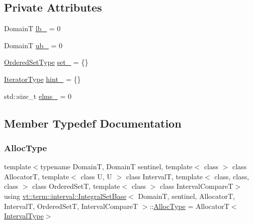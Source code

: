 \subsection*{Private Attributes}
\begin{DoxyCompactItemize}
\item 
DomainT \hyperlink{structvt_1_1term_1_1interval_1_1_integral_set_base_a81a48c32a51a56d1006dc212b2de60aa}{lb\+\_\+} = 0
\item 
DomainT \hyperlink{structvt_1_1term_1_1interval_1_1_integral_set_base_ace5d01da6b573a7e13405b362ca57f48}{ub\+\_\+} = 0
\item 
\hyperlink{structvt_1_1term_1_1interval_1_1_integral_set_base_af29bc3750493c7de4043f43ef7eb2ca2}{Ordered\+Set\+Type} \hyperlink{structvt_1_1term_1_1interval_1_1_integral_set_base_a5ed151f2f412d1df26f6b1fae4515bad}{set\+\_\+} = \{\}
\item 
\hyperlink{structvt_1_1term_1_1interval_1_1_integral_set_base_a111b2ec1ea960a40ba4270be702f11f1}{Iterator\+Type} \hyperlink{structvt_1_1term_1_1interval_1_1_integral_set_base_a50bd3ba628483148568402f9b474f680}{hint\+\_\+} = \{\}
\item 
std\+::size\+\_\+t \hyperlink{structvt_1_1term_1_1interval_1_1_integral_set_base_a6b6c9d51286b662d28eb1dfac3047af0}{elms\+\_\+} = 0
\end{DoxyCompactItemize}


\subsection{Member Typedef Documentation}
\mbox{\label{structvt_1_1term_1_1interval_1_1_integral_set_base_af699b4961903ebe28d478088eae9b60a}} 
\subsubsection{\texorpdfstring{Alloc\+Type}{AllocType}}
{\footnotesize\ttfamily template$<$typename DomainT, DomainT sentinel, template$<$ class $>$ class AllocatorT, template$<$ class U, U $>$ class IntervalT, template$<$ class, class, class $>$ class Ordered\+SetT, template$<$ class $>$ class Interval\+CompareT$>$ \\
using \hyperlink{structvt_1_1term_1_1interval_1_1_integral_set_base}{vt\+::term\+::interval\+::\+Integral\+Set\+Base}$<$ DomainT, sentinel, AllocatorT, IntervalT, Ordered\+SetT, Interval\+CompareT $>$\+::\hyperlink{structvt_1_1term_1_1interval_1_1_integral_set_base_af699b4961903ebe28d478088eae9b60a}{Alloc\+Type} =  AllocatorT$<$\hyperlink{structvt_1_1term_1_1interval_1_1_integral_set_base_a1f8f5bb84064be35bbaaf15bb5a43f14}{Interval\+Type}$>$}


